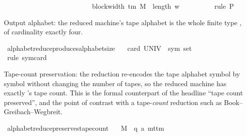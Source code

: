 \begin{isabellebody}
\ \ \ \ \ \ \ \ \ \ \ \ \ \ \ \ \ \ \ \ \ \ \ {\isacharplus}{\kern0pt}\ {}\ {\isacharasterisk}{\kern0pt}\ block{\isacharunderscore}{\kern0pt}width\ {\isacharparenleft}{\kern0pt}{\isasymGamma}{\isacharunderscore}{\kern0pt}tm\ M{\isacharparenright}{\kern0pt}\ {\isacharasterisk}{\kern0pt}\ length\ w\ {\isacharplus}{\kern0pt}\ {}{\isacharparenright}{\kern0pt}{\isachardoublequoteclose}\isanewline
\ \ \ \ \ \ \isamarkupfalse%
\ {\isacharparenleft}{\kern0pt}rule\ P{\isacharparenright}{\kern0pt}\isanewline
\ \ \isamarkupfalse%
\isanewline
{}\isamarkupfalse%
%
\endisatagproof
{\isafoldproof}%
%
\isadelimproof
%
\endisadelimproof
%
\begin{isamarkuptext}%
Output alphabet: the reduced machine's tape alphabet is the
  whole finite type , of cardinality exactly four.%
\end{isamarkuptext}\isamarkuptrue%
\isamarkupfalse%
\ alphabet{\isacharunderscore}{\kern0pt}reduce{\isacharunderscore}{\kern0pt}produces{\isacharunderscore}{\kern0pt}alphabet{\isacharunderscore}{\kern0pt}size{\isacharunderscore}{\kern0pt}{}{\isacharcolon}{\kern0pt}\isanewline
\ \ \ {\isachardoublequoteopen}card\ {\isacharparenleft}{\kern0pt}UNIV\ {\isacharcolon}{\kern0pt}{\isacharcolon}{\kern0pt}\ sym{}\ set{\isacharparenright}{\kern0pt}\ {\isacharequal}{\kern0pt}\ {}{\isachardoublequoteclose}\isanewline
%
\isadelimproof
\ \ %
\endisadelimproof
%
\isatagproof
{}\isamarkupfalse%
\ {\isacharparenleft}{\kern0pt}rule\ sym{}{\isacharunderscore}{\kern0pt}card{\isacharparenright}{\kern0pt}%
\endisatagproof
{\isafoldproof}%
%
\isadelimproof
%
\endisadelimproof
%
\begin{isamarkuptext}%
Tape-count preservation: the reduction re-encodes the tape
  alphabet symbol by symbol without changing the number of tapes, so
  the reduced machine has exactly 's tape count.  This is the
  formal counterpart of the headline ``tape count preserved'', and the
  point of contrast with a tape-\emph{count} reduction such as
  Book--Greibach--Wegbreit.%
\end{isamarkuptext}\isamarkuptrue%
\isamarkupfalse%
\ alphabet{\isacharunderscore}{\kern0pt}reduce{\isacharunderscore}{\kern0pt}preserves{\isacharunderscore}{\kern0pt}tape{\isacharunderscore}{\kern0pt}count{\isacharcolon}{\kern0pt}\isanewline
\ \ \ M\ {\isacharcolon}{\kern0pt}{\isacharcolon}{\kern0pt}\ {\isachardoublequoteopen}{\isacharparenleft}{\kern0pt}{\isacharprime}{\kern0pt}q{\isacharcomma}{\kern0pt}\ {\isacharprime}{\kern0pt}a{\isacharparenright}{\kern0pt}\ mttm{\isachardoublequoteclose}\isanewline

\end{isabellebody}
